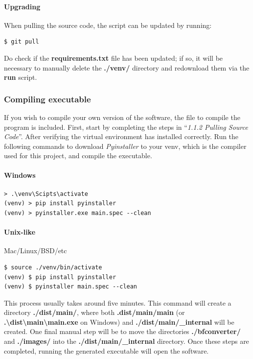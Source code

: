 \documentclass[12pt]{extarticle}
\begin{document}
			\paragraph{Upgrading} When pulling the source code, the script can be updated by running:

			\begin{lstlisting}[style=cmd]
$ git pull
			\end{lstlisting}

			Do check if the \textbf{requirements.txt} file has been updated; if so, it will be necessary to manually delete the \textbf{./venv/} directory and redownload them via the \textbf{run} script.

		\subsubsection{Compiling executable}

			If you wish to compile your own version of the software, the file to compile the program is included. First, start by completing the steps in ``\textit{1.1.2 Pulling Source Code}''.
			After verifying the virtual environment has installed correctly. Run the following commands to download \textit{Pyinstaller} to your venv, which is the compiler used for this project, and compile the executable.


			\paragraph{Windows} \phantom{text}

			\begin{lstlisting}[style=cmd]
> .\venv\Scipts\activate
(venv) > pip install pyinstaller
(venv) > pyinstaller.exe main.spec --clean
			\end{lstlisting}

			\paragraph{Unix-like} Mac/Linux/BSD/etc

			\begin{lstlisting}[style=cmd]
$ source ./venv/bin/activate
(venv) $ pip install pyinstaller
(venv) $ pyinstaller main.spec --clean
			\end{lstlisting}

			This process usually takes around five minutes. This command will create a directory \textbf{./dist/main/}, where both \textbf{.dist/main/main} (or \textbf{.\textbackslash dist\textbackslash main\textbackslash main.exe} on Windows) and \textbf{./dist/main/\_internal} will be created. 
			One final manual step will be to move the directories \textbf{./bfconverter/} and \textbf{./images/} into the \textbf{./dist/main/\_internal} directory. Once these steps are completed, running the generated executable will open the software.
\end{document}
